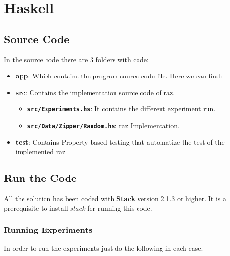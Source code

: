 \documentclass[12pt, a4paper]{article}
\begin{document}



\printglossary[type=\acronymtype]

\appendix\label{apx:org}
\section{Haskell}
\subsection{Source Code}
In the source code there are 3 folders with code:

\begin{itemize}
  \item \textbf{app}: Which contains the program source code file. Here we can find:
  \item \textbf{src}: Contains the implementation source code of \acrshort{raz}.
    \begin{itemize}
      \item \textbf{\texttt{src/Experiments.hs}}: It contains the different experiment run.
      \item \textbf{\texttt{src/Data/Zipper/Random.hs}}: \acrshort{raz} Implementation.
    \end{itemize}
  \item \textbf{test}: Contains Property based testing that automatize the test of the implemented \acrshort{raz}
\end{itemize}

\subsection{Run the Code}
All the solution has been coded with \textbf{Stack} \cite{stack} version 2.1.3 or higher. It is a prerequisite to install \textit{stack} for running this code.

\subsubsection{Running Experiments}
In order to run the experiments just do the following in each case.
\end{document}
